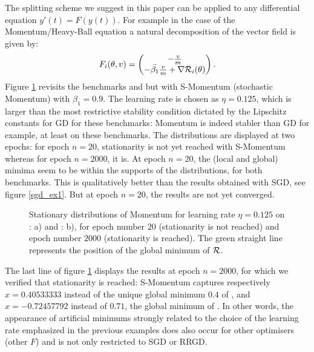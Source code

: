 \begin{remark}
	The splitting scheme we suggest in this paper can be applied to any differential equation $y'(t)=F(y(t))$. For example in the case of the Momentum/Heavy-Ball equation \cite{momentum_sutskever_RNN,Polyak,polyak_momentum_stability,continuous_general} a natural decomposition of the vector field is given by:
	\begin{equation*}
		F_i(\theta,v) = 
		\begin{pmatrix}
                  -\frac{v}{m} \\
                        -{\bar{\beta_1}}\frac{v}{m}+\nabla \mathcal{R}_i(\theta)
		\end{pmatrix}.
	\end{equation*}
        Figure \ref{mom_ex1_ex2} revisits the benchmarks \exOne and \exTwo but with S-Momentum (stochastic Momentum) with $\beta_1=0.9$. 
        The learning rate is chosen as $\eta=0.125$, which is larger than the most restrictive stability condition dictated by the Lipschitz constants for GD for these benchmarks:
        Momentum is indeed stabler than GD for example, at least on these benchmarks. 
        The distributions are displayed at two epochs: for epoch $n=20$, stationarity is not yet reached with S-Momentum whereas for epoch $n=2000$, it is.  
        At epoch $n=20$, the (local and global) mimima seem to be within the supports of the distributions, for both benchmarks. This 
        is qualitatively better than the results obtained with SGD, see figure \ref{sgd_ex1}. 
        But at epoch $n=20$, the results are not yet converged.  
\begin{figure}[!h]
	\centering
          \scalebox{0.45}{}
	\scalebox{0.45}{}
        \caption{Stationary distributions of Momentum for learning rate $\eta=0.125$ on \exOne: a) and \exTwo: b), for epoch number $20$ (stationarity is not reached) and epoch number $2000$ (stationarity is reached). The green straight line represents the position of the global minimum of $\mathcal{R}$.}
	\label{mom_ex1_ex2}
\end{figure}
  The last line of figure \ref{mom_ex1_ex2} displays the results at epoch $n=2000$, for which we verified that stationarity is reached:  S-Momentum captures respectively
  $x=0.40533333$ instead of the unique global minimum $0.4$ of \exOne, 
  and $x=-0.72457792$ instead of $0.71$, the global minimum of \exTwo. 
  In other words, the appearance of artificial minimums strongly related to the choice of the learning rate emphasized in the previous examples does also occur for other optimisers
  (other $F$) and is not only restricted to SGD or RRGD. 


\end{remark}
